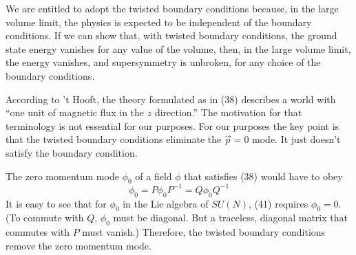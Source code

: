 We are entitled to adopt the twisted boundary conditions because,
in the large volume limit, the physics is expected to be
independent of the boundary conditions. If we can show that, with
twisted boundary conditions, the ground state energy vanishes for
any value of the volume, then, in the large volume limit, the energy
vanishes, and supersymmetry is unbroken, for any choice of the
boundary conditions.

According to 't Hooft, the theory formulated as in (38) describes
a world with ``one unit of magnetic flux in the $z$ direction.''
The motivation for that terminology is not essential for our purposes.
For our purposes the key point is that the twisted boundary
conditions eliminate the $\vec p = 0$ mode. It just doesn't satisfy the
boundary condition.

The zero momentum mode $\phi_0$ of a field $\phi$ that satisfies (38)
would have to obey
\begin{equation}
\phi_0 = P \phi_0 P^{-1} = Q \phi_0 Q^{-1}
\tag{41}
\end{equation}
It is easy to see that for $\phi_0$ in the Lie algebra of $SU(N)$, (41)
requires $\phi_0 = 0$. (To commute with $Q$, $\phi_0$ must be diagonal. But a
traceless, diagonal matrix that commutes with $P$ must vanish.) Therefore,
the twisted boundary conditions remove the zero momentum mode.
